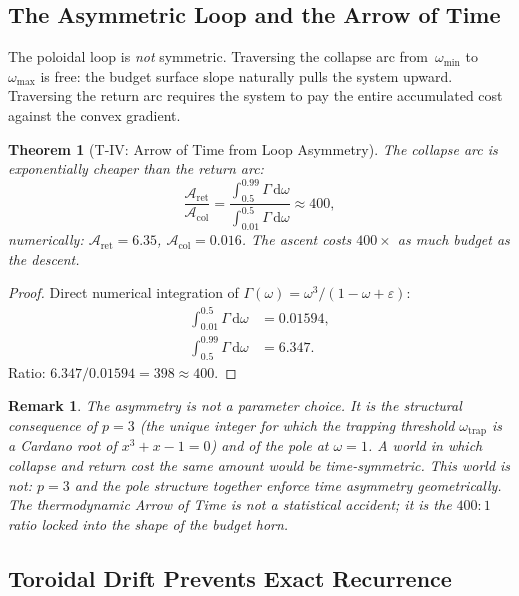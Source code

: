 \documentclass[
  aps,
  prd,
  twocolumn,
  superscriptaddress,
  nofootinbib,
  floatfix
]{revtex4-2}
\newtheorem{theorem}{Theorem}
\newtheorem{remark}{Remark}
\newcommand{\Gam}{\Gamma}
\newcommand{\eps}{\varepsilon}
\newcommand{\dd}{\mathrm{d}}
\newcommand{\Aret}{\mathcal{A}_{\mathrm{ret}}}         %
\newcommand{\Acol}{\mathcal{A}_{\mathrm{col}}}         %
\begin{document}
\subsection{The Asymmetric Loop and the Arrow of Time}

The poloidal loop is \emph{not} symmetric.  Traversing the
collapse arc from~$\omega_{\min}$ to~$\omega_{\max}$ is free:
the budget surface slope naturally pulls the system upward.
Traversing the return arc requires the system to pay the
entire accumulated cost against the convex gradient.

\begin{theorem}[T-IV: Arrow of Time from Loop Asymmetry]
\label{thm:T4}
The collapse arc is exponentially cheaper than the return arc:
\begin{equation}
  \frac{\Aret}{\Acol} = \frac{\int_{0.5}^{0.99}\Gam\,\dd\omega}
                             {\int_{0.01}^{0.5}\Gam\,\dd\omega}
                      \approx 400,
  \label{eq:asymmetry}
\end{equation}
numerically: $\Aret = 6.35$, $\Acol = 0.016$.  The ascent
costs $400\times$ as much budget as the descent.
\end{theorem}

\begin{proof}
Direct numerical integration of $\Gam(\omega) =
\omega^3/(1-\omega+\eps)$:
\begin{align}
  \int_{0.01}^{0.5}\Gam\,\dd\omega &= 0.01594, \\
  \int_{0.5}^{0.99}\Gam\,\dd\omega &= 6.347.
\end{align}
Ratio: $6.347 / 0.01594 = 398 \approx 400$.
\end{proof}

\begin{remark}
The asymmetry is not a parameter choice.  It is the
structural consequence of $p = 3$ (the unique integer for
which the trapping threshold $\omega_{\mathrm{trap}}$ is a
Cardano root of $x^3 + x - 1 = 0$) and of the pole
at $\omega = 1$.  A world in which collapse and return
cost the same amount would be time-symmetric.  This world
is not: $p = 3$ and the pole structure together enforce
time asymmetry geometrically.  The thermodynamic Arrow of
Time is not a statistical accident; it is the $400:1$
ratio locked into the shape of the budget horn.
\end{remark}

\subsection{Toroidal Drift Prevents Exact Recurrence}
\end{document}
